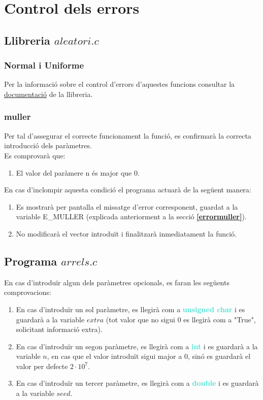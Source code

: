 \documentclass[a4paper, 11pt]{article}
\begin{document}
\newpage
\section{Control dels errors}
\subsection{Llibreria $aleatori.c$}
\subsubsection{Normal i Uniforme}
Per la informació sobre el control d'errors d'aquestes funcions consultar la \textcolor{blue}{\href{https://www.overleaf.com/read/nxmjqvcfdtrt}{documentació}} de la llibreria.
\subsubsection{muller}
Per tal d'assegurar el correcte funcionament la funció, es confirmarà la correcta introducció dels paràmetres.\\
Es comprovarà que:
\begin{enumerate}
    \item El valor del paràmere n és major que $0$.
\end{enumerate}
En cas d'inclompir aquesta condició el programa actuarà de la següent manera:
\begin{enumerate}
    \item Es mostrarà per pantalla el missatge d'error corresponent, guardat a la variable \textcolor{Dandelion}{E\_MULLER} (explicada anteriorment a la secció \textcolor{blue}{\textbf{\ref{errormuller}}}).
    \item No modificarà el vector introduït i finalitzarà inmediatament la funció.
\end{enumerate}

\subsection{Programa $arrels.c$}
En cas d'introduïr algun dels paràmetres opcionals, es faran les següents comprovacions:
\begin{enumerate}
    \item En cas d'introduïr un sol paràmetre, es llegirà com a  \textbf{\textcolor{Turquoise}{unsigned char}} i es guardarà a la variable $extra$ (tot valor que no sigui 0 es llegirà com a "True", solicitant informació extra). 
    \item En cas d'introduïr un segon paràmetre, es llegirà com a \textbf{\textcolor{Turquoise}{int}} i es guardarà a la variable $n$, en cas que el valor introduït sigui major a 0, sinó es guardarà el valor per defecte $2\cdot10^7$. 
    \item En cas d'introduïr un tercer paràmetre, es llegirà com a \textbf{\textcolor{Turquoise}{double}} i es guardarà a la variable $seed$. 
\end{enumerate}
\end{document}
